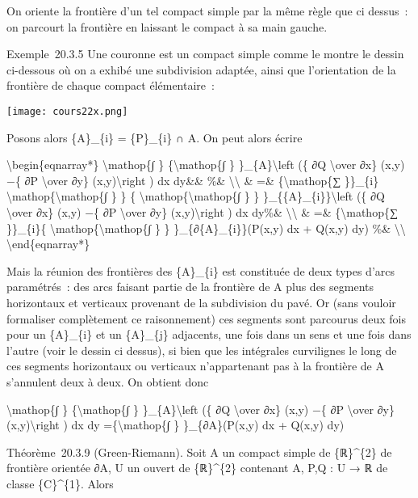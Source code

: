 \documentclass[]{article}
\begin{document}
On oriente la frontière d'un tel compact simple par la même règle que ci
dessus~: on parcourt la frontière en laissant le compact à sa main
gauche.

Exemple~20.3.5 Une couronne est un compact simple comme le montre le
dessin ci-dessous où on a exhibé une subdivision adaptée, ainsi que
l'orientation de la frontière de chaque compact élémentaire~:

\texttt{[image: cours22x.png]}

Posons alors \{A\}\_\{i\} = \{P\}\_\{i\} ∩ A. On peut alors écrire

\textbackslash{}begin\{eqnarray*\} \textbackslash{}mathop\{∫ \}
\{\textbackslash{}mathop\{∫ \} \}\_\{A\}\textbackslash{}left (\{ ∂Q
\textbackslash{}over ∂x\} (x,y) −\{ ∂P \textbackslash{}over ∂y\}
(x,y)\textbackslash{}right ) dx dy\&\& \%\&
\textbackslash{}\textbackslash{} \& =\& \{\textbackslash{}mathop\{∑
\}\}\_\{i\} \textbackslash{}mathop\{\textbackslash{}mathop\{∫ \} \} \{
\textbackslash{}mathop\{\textbackslash{}mathop\{∫ \} \}
\}\_\{\{A\}\_\{i\}\}\textbackslash{}left (\{ ∂Q \textbackslash{}over
∂x\} (x,y) −\{ ∂P \textbackslash{}over ∂y\} (x,y)\textbackslash{}right )
dx dy\%\& \textbackslash{}\textbackslash{} \& =\&
\{\textbackslash{}mathop\{∑ \}\}\_\{i\}\{
\textbackslash{}mathop\{\textbackslash{}mathop\{∫ \} \}
\}\_\{∂\{A\}\_\{i\}\}(P(x,y) dx + Q(x,y) dy) \%\&
\textbackslash{}\textbackslash{} \textbackslash{}end\{eqnarray*\}

Mais la réunion des frontières des \{A\}\_\{i\} est constituée de deux
types d'arcs paramétrés~: des arcs faisant partie de la frontière de A
plus des segments horizontaux et verticaux provenant de la subdivision
du pavé. Or (sans vouloir formaliser complètement ce raisonnement) ces
segments sont parcourus deux fois pour un \{A\}\_\{i\} et un
\{A\}\_\{j\} adjacents, une fois dans un sens et une fois dans l'autre
(voir le dessin ci dessus), si bien que les intégrales curvilignes le
long de ces segments horizontaux ou verticaux n'appartenant pas à la
frontière de A s'annulent deux à deux. On obtient donc

\textbackslash{}mathop\{∫ \} \{\textbackslash{}mathop\{∫ \}
\}\_\{A\}\textbackslash{}left (\{ ∂Q \textbackslash{}over ∂x\} (x,y) −\{
∂P \textbackslash{}over ∂y\} (x,y)\textbackslash{}right ) dx dy
=\{\textbackslash{}mathop\{∫ \} \}\_\{∂A\}(P(x,y) dx + Q(x,y) dy)

Théorème~20.3.9 (Green-Riemann). Soit A un compact simple de
\{ℝ\}\^{}\{2\} de frontière orientée ∂A, U un ouvert de \{ℝ\}\^{}\{2\}
contenant A, P,Q : U → ℝ de classe \{C\}\^{}\{1\}. Alors
\end{document}
